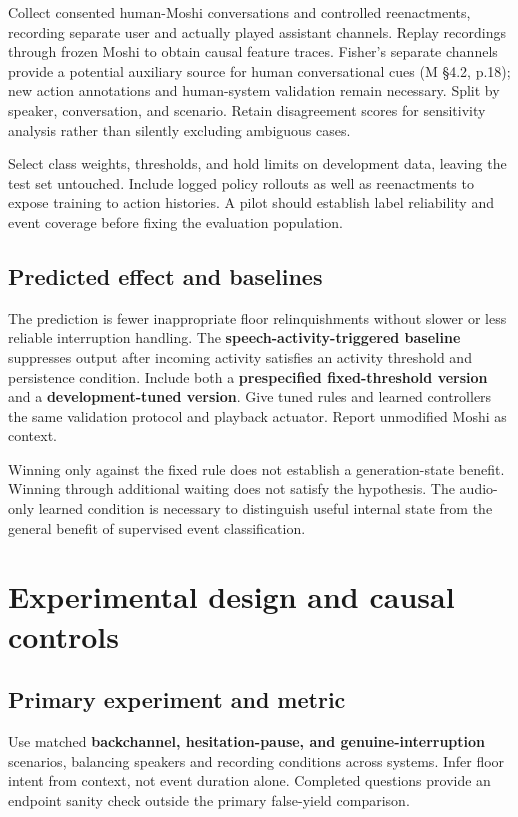 \documentclass[11pt]{article}
\begin{document}
Collect consented human-Moshi conversations and controlled reenactments, recording separate user and actually played assistant channels. Replay recordings through frozen Moshi to obtain causal feature traces. Fisher's separate channels provide a potential auxiliary source for human conversational cues (M §4.2, p.18); new action annotations and human-system validation remain necessary. Split by speaker, conversation, and scenario. Retain disagreement scores for sensitivity analysis rather than silently excluding ambiguous cases.

Select class weights, thresholds, and hold limits on development data, leaving the test set untouched. Include logged policy rollouts as well as reenactments to expose training to action histories. A pilot should establish label reliability and event coverage before fixing the evaluation population.

\subsection{Predicted effect and baselines}

The prediction is fewer inappropriate floor relinquishments without slower or less reliable interruption handling. The \textbf{speech-activity-triggered baseline} suppresses output after incoming activity satisfies an activity threshold and persistence condition. Include both a \textbf{prespecified fixed-threshold version} and a \textbf{development-tuned version}. Give tuned rules and learned controllers the same validation protocol and playback actuator. Report unmodified Moshi as context.

Winning only against the fixed rule does not establish a generation-state benefit. Winning through additional waiting does not satisfy the hypothesis. The audio-only learned condition is necessary to distinguish useful internal state from the general benefit of supervised event classification.

\newpage
\section{Experimental design and causal controls}

\subsection{Primary experiment and metric}

Use matched \textbf{backchannel, hesitation-pause, and genuine-interruption} scenarios, balancing speakers and recording conditions across systems. Infer floor intent from context, not event duration alone. Completed questions provide an endpoint sanity check outside the primary false-yield comparison.
\end{document}

